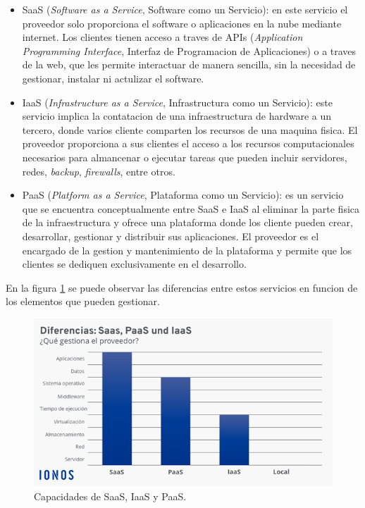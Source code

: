 \begin{itemize}
	\item SaaS (\textit{Software as a Service}, Software como un Servicio): en este servicio el proveedor solo proporciona el software o aplicaciones en la nube mediante internet. Los clientes tienen acceso a traves de APIs (\textit{Application Programming Interface}, Interfaz de Programacion de Aplicaciones) o a traves de la web, que les permite interactuar de manera sencilla, sin la necesidad de gestionar, instalar ni actulizar el software. 
	\item IaaS (\textit{Infrastructure as a Service}, Infrastructura como un Servicio): este servicio implica la contatacion de una infraestructura de hardware a un tercero, donde varios cliente comparten los recursos de una maquina fisica. El proveedor proporciona a sus clientes el acceso a los recursos computacionales necesarios para almancenar o ejecutar tareas que pueden incluir servidores, redes, \textit{backup}, \textit{firewalls}, entre otros.
	\item PaaS (\textit{Platform as a Service}, Plataforma como un Servicio): es un servicio que se encuentra conceptualmente entre SaaS e IaaS al eliminar la parte fisica de la infraestructura y ofrece una plataforma donde los cliente pueden crear, desarrollar, gestionar y distribuir sus aplicaciones. El proveedor es el encargado de la gestion y mantenimiento de la plataforma y permite que los clientes se dediquen exclusivamente en el desarrollo.
\end{itemize}

En la figura \ref{fig:cloud_services} se puede observar las diferencias entre estos servicios en funcion de los elementos que pueden gestionar.

\begin{figure}[h]
	\centering
	\includegraphics[scale=0.55]{./Figures/cloud_services.png}
	\caption{Capacidades de SaaS, IaaS y PaaS\protect\footnotemark.}
	\label{fig:cloud_services}
\end{figure}


